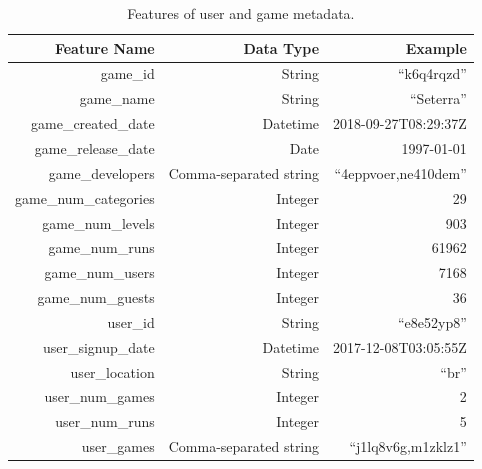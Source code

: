 \renewcommand{\arraystretch}{1.2}
\begin{table}[h]
    \centering
    \begin{tabular}{|*{3}{D|}}
        \hline
        \textbf{Feature Name} & \textbf{Data Type} & \textbf{Example} \\ \hline
        game\_id & String & ``k6q4rqzd'' \\ \hline
        game\_name & String & ``Seterra'' \\ \hline
        game\_created\_date & Datetime & 2018-09-27T08:29:37Z \\ \hline
        game\_release\_date & Date & 1997-01-01 \\ \hline
        game\_developers & Comma-separated string & ``4eppvoer,ne410dem'' \\ \hline
        game\_num\_categories & Integer & 29 \\ \hline
        game\_num\_levels & Integer & 903 \\ \hline
        game\_num\_runs & Integer & 61962 \\ \hline
        game\_num\_users & Integer & 7168 \\ \hline
        game\_num\_guests & Integer & 36 \\ \hline
        user\_id & String & ``e8e52yp8'' \\ \hline
        user\_signup\_date & Datetime & 2017-12-08T03:05:55Z \\ \hline
        user\_location & String & ``br'' \\ \hline
        user\_num\_games & Integer & 2 \\ \hline
        user\_num\_runs & Integer & 5 \\ \hline
        user\_games & Comma-separated string & ``j1lq8v6g,m1zklz1''\\ \hline
    \end{tabular}
    \caption{Features of user and game metadata.}
    \label{tab:my_label}
\end{table}

